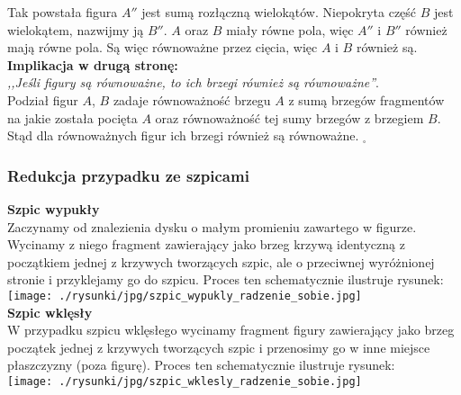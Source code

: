 \documentclass[a4paper, 12pt, twosided]{article}
\newcommand{\todo}[1]{\hfill \break \textbf{\Huge \textcolor{violet}{TO DO: #1} \hfill \break}
\normalsize}
\begin{document}
Tak powstała figura $A''$ jest sumą rozłączną wielokątów. Niepokryta część $B$ jest wielokątem,
nazwijmy ją $B''$. $A$ oraz $B$ miały równe pola, więc $A''$ i $B''$ również mają równe pola.
Są więc równoważne przez cięcia, więc $A$ i $B$ również są. \\[8pt]
\noindent \textbf{Implikacja w drugą stronę:} \\
\textit{,,Jeśli figury są równoważne, to ich brzegi również są równoważne''}. \\
Podział figur $A$, $B$ zadaje równoważność brzegu $A$ z sumą brzegów fragmentów na jakie została 
 pocięta $A$
oraz równoważność tej sumy brzegów z brzegiem $B$. Stąd dla równoważnych figur ich brzegi również 
są
równoważne.
$_\square$ 
\subsubsection{Redukcja przypadku ze szpicami}\label{Redukcja szpiców}
\textbf{Szpic wypukły}\\
Zaczynamy od znalezienia dysku o małym promieniu zawartego w figurze. Wycinamy z niego fragment 
zawierający jako brzeg krzywą identyczną z początkiem jednej z krzywych tworzących szpic, ale 
o przeciwnej wyróżnionej stronie i przyklejamy go do szpicu. Proces ten schematycznie 
ilustruje rysunek: \\
\texttt{[image: ./rysunki/jpg/szpic\_wypukly\_radzenie\_sobie.jpg]} \\
\noindent\textbf{Szpic wklęsły}\\
W przypadku szpicu wklęsłego wycinamy fragment figury zawierający jako brzeg początek jednej z 
krzywych tworzących szpic i przenosimy go w inne miejsce płaszczyzny (poza figurę). 
Proces ten schematycznie ilustruje rysunek: \\
\texttt{[image: ./rysunki/jpg/szpic\_wklesly\_radzenie\_sobie.jpg]} 
\end{document}
